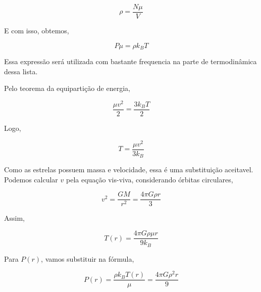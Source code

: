 \documentclass[11pt]{article}
\begin{document}
\begin{pproblem}
\begin{pssolution*}{}{}
\begin{alternativas}
        \[\rho = \frac{N\mu}{V}\]
        
        E com isso, obtemos, 

        \[\boxed{P\mu = \rho k_B T}\]

        Essa expressão será utilizada com bastante frequencia na parte de termodinâmica dessa lista.

        \item Pelo teorema da equipartição de energia, 
        
        \[\frac{\mu v^2}{2} = \frac{3k_B T}{2}\]

        Logo, 
    
        \[T = \frac{\mu v^2}{3k_B}\]

        Como as estrelas possuem massa e velocidade, essa é uma substituição aceitavel. Podemos calcular \(v\) pela equação vis-viva, considerando órbitas circulares, 

        \[v^2 = \frac{GM}{r^2} = \frac{4\pi G\rho r}{3}\]

        Assim, 

        \[\boxed{T(r) = \frac{4\pi G \rho \mu r}{9k_B}}\]

        Para \(P(r)\), vamos substituir na fórmula, 

        \[\boxed{P(r) = \frac{\rho k_B T(r)}{\mu} = \frac{4\pi G \rho^2 r}{9}}\]
    \end{alternativas}
    
\end{pssolution*}
\end{pproblem}
\end{document}
